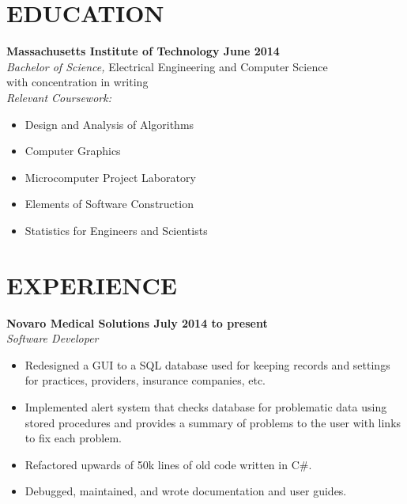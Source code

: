 \documentclass[line,margin]{res}
\begin{document}
\address{2706 Erlene Dr. Apt 146, Cincinnati OH, 45238 \\ (419) 343-4892}
\address{cwclemens@gmail.com \\ curtisclemens.com}
 
\begin{resume}
 
 
\section{EDUCATION} {\bf Massachusetts Institute of Technology \hfill June 2014} \\         
		{\sl Bachelor of Science,} Electrical Engineering and Computer Science \\ %
		with concentration in writing \\
		{\it Relevant Coursework:}
		\begin{multicols}{2} \begin{itemize} \setlength{\itemsep}{-2pt}
		\item Design and Analysis of Algorithms
		\item Computer Graphics
		\item Microcomputer Project Laboratory
		\item Elements of Software Construction
		\item Statistics for Engineers and Scientists
		\end{itemize} \end{multicols}
		
		
 \section{EXPERIENCE} {\bf Novaro Medical Solutions \hfill July 2014 to present} \\
			{\sl Software Developer} \\
			\vspace{-4mm} \begin{itemize} \setlength{\itemsep}{-2pt}
			\item Redesigned a GUI to a SQL database used for keeping records and settings for practices, providers, insurance companies, etc.
                        \item Implemented alert system that checks database for problematic data using stored procedures and provides a summary of problems to the user with links to fix each problem.
			\item Refactored upwards of 50k lines of old code written in C\#.
			\item Debugged, maintained, and wrote documentation and user guides.
			\end{itemize}
 

\end{resume}
\end{document}
